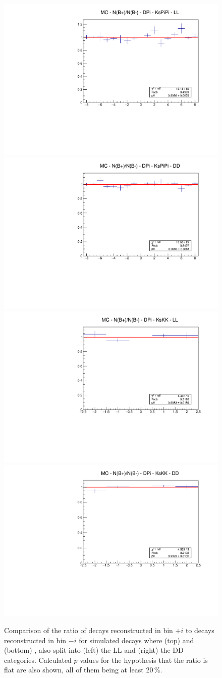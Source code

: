 \begin{figure}[tb]
    \centering
    \includegraphics[width=0.45\columnwidth]{figures/analysis/systematics/MC__Pi_PiPi_LL_comparison.pdf}
    \includegraphics[width=0.45\columnwidth]{figures/analysis/systematics/MC__Pi_PiPi_DD_comparison.pdf}
    \includegraphics[width=0.45\columnwidth]{figures/analysis/systematics/MC__Pi_KK_LL_comparison.pdf}
    \includegraphics[width=0.45\columnwidth]{figures/analysis/systematics/MC__Pi_KK_DD_comparison.pdf}
    \caption{Comparison of the ratio of \Bm decays reconstructed in bin $+i$ to \Bp decays reconstructed in bin $-i$ for simulated \BtoDpi decays where (top) \DtoKspp and (bottom) \DtoKskk, also split into (left) the LL and (right) the DD categories. Calculated $p$ values for the hypothesis that the ratio is flat are also shown, all of them being at least 20\,\%.}
    \label{fig:efficiency_symmetry_check}
\end{figure}



